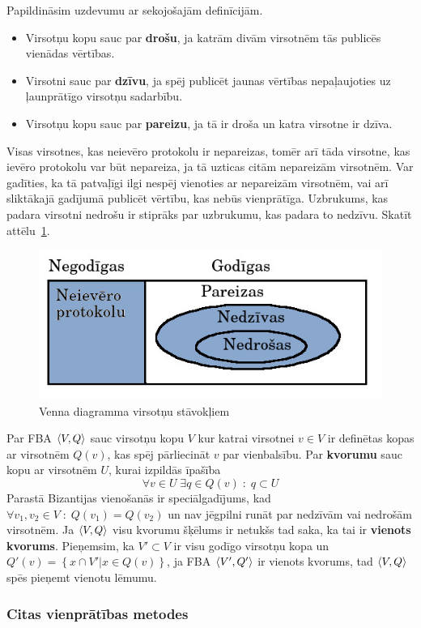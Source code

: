 Papildināsim uzdevumu ar sekojošajām definīcijām.
\begin{itemize}
    \item Virsotņu kopu sauc par \textbf{drošu}, ja katrām divām virsotnēm tās publicēs vienādas vērtības.
    \item Virsotni sauc par \textbf{dzīvu}, ja spēj publicēt jaunas vērtības nepaļaujoties uz ļaunprātīgo virsotņu sadarbību.
    \item Virsotņu kopu sauc par \textbf{pareizu}, ja tā ir droša un katra virsotne ir dzīva.
\end{itemize}
Visas virsotnes, kas neievēro protokolu ir nepareizas, tomēr arī tāda virsotne, kas ievēro protokolu var būt nepareiza, ja tā uzticas citām nepareizām virsotnēm. Var gadīties, ka tā patvaļīgi ilgi nespēj vienoties ar nepareizām virsotnēm, vai arī sliktākajā gadījumā publicēt vērtību, kas nebūs vienprātīga. Uzbrukums, kas padara virsotni nedrošu ir stiprāks par uzbrukumu, kas padara to nedzīvu. Skatīt attēlu~\ref{fig:node-fail}.
\begin{figure}[htpb]
    \centering
    \includegraphics[scale=0.5]{teorija/node-fail.jpg}
    \caption{Venna diagramma virsotņu stāvokļiem}
\label{fig:node-fail}
\end{figure}

Par FBA $\langle V,Q \rangle$ sauc virsotņu kopu $V$ kur katrai virsotnei $v\in V$ ir definētas kopas ar virsotnēm $Q(v)$, kas spēj pārliecināt $v$ par vienbalsību. Par \textbf{kvorumu} sauc kopu ar virsotnēm $U$, kurai izpildās īpašība
\begin{equation*}
    \forall v \in U \;\exists q \in Q(v) \;:\; q \subset U
\end{equation*}
Parastā Bizantijas vienošanās ir speciālgadījums, kad $\forall v_1,v_2\in V \;:\; Q(v_1) = Q(v_2)$ un nav jēgpilni runāt par nedzīvām vai nedrošām virsotnēm.
Ja $\langle V,Q \rangle$ visu kvorumu šķēlums ir netukšs tad saka, ka tai ir \textbf{vienots kvorums}. Pieņemsim, ka $V'\subset V$ ir visu godīgo virsotņu kopa un $Q'(v) = \left\{ x\cap V' | x\in Q(v) \right\}$, ja FBA $\langle V',Q' \rangle$ ir vienots kvorums, tad $\langle V,Q \rangle$ spēs pieņemt vienotu lēmumu.\cite{mazieres15}

\subsubsection{Citas vienprātības metodes}

